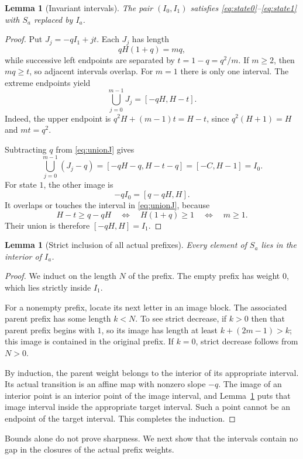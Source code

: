 \documentclass[11pt]{article}
\numberwithin{equation}{section}
\newtheorem{lemma}[theorem]{Lemma}
\theoremstyle{definition}
\theoremstyle{remark}
\begin{document}
\begin{lemma}[Invariant intervals]\label{lem:intervals}
The pair $(I_0,I_1)$ satisfies \eqref{eq:state0}--\eqref{eq:state1}
with $S_a$ replaced by $I_a$.
\end{lemma}
\begin{proof}
Put $J_j=-qI_1+jt$. Each $J_j$ has length
\[
qH(1+q)=mq,
\]
while successive left endpoints are separated by $t=1-q=q^2/m$.
If $m\ge2$, then $mq\ge t$, so adjacent intervals overlap. For $m=1$
there is only one interval. The extreme endpoints yield
\begin{equation}\label{eq:unionJ}
\bigcup_{j=0}^{m-1}J_j=[-qH,H-t].
\end{equation}
Indeed, the upper endpoint is $q^2H+(m-1)t=H-t$, since
$q^2(H+1)=H$ and $mt=q^2$.

Subtracting $q$ from \eqref{eq:unionJ} gives
\[
\bigcup_{j=0}^{m-1}(J_j-q)=[-qH-q,H-t-q]=[-C,H-1]=I_0.
\]
For state $1$, the other image is
\[
-qI_0=[q-qH,H].
\]
It overlaps or touches the interval in \eqref{eq:unionJ}, because
\[
H-t\ge q-qH
\quad\Longleftrightarrow\quad H(1+q)\ge1
\quad\Longleftrightarrow\quad m\ge1.
\]
Their union is therefore $[-qH,H]=I_1$.
\end{proof}

\begin{lemma}[Strict inclusion of all actual prefixes]\label{lem:strict}
Every element of $S_a$ lies in the interior of $I_a$.
\end{lemma}
\begin{proof}
We induct on the length $N$ of the prefix. The empty prefix has weight
$0$, which lies strictly inside $I_1$.

For a nonempty prefix, locate its next letter in an image block. The
associated parent prefix has some length $k<N$. To see strict decrease,
if $k>0$ then that parent prefix begins with $1$, so its image has length
at least $k+(2m-1)>k$; this image is contained in the original prefix.
If $k=0$, strict decrease follows from $N>0$.

By induction, the parent weight belongs to the interior of its appropriate
interval. Its actual transition is an affine map with nonzero slope
$-q$. The image of an interior point is an interior point of the image
interval, and Lemma~\ref{lem:intervals} puts that image interval inside
the appropriate target interval. Such a point cannot be an endpoint of
the target interval. This completes the induction.
\end{proof}

Bounds alone do not prove sharpness. We next show that the intervals
contain no gap in the closures of the actual prefix weights.
\end{document}

